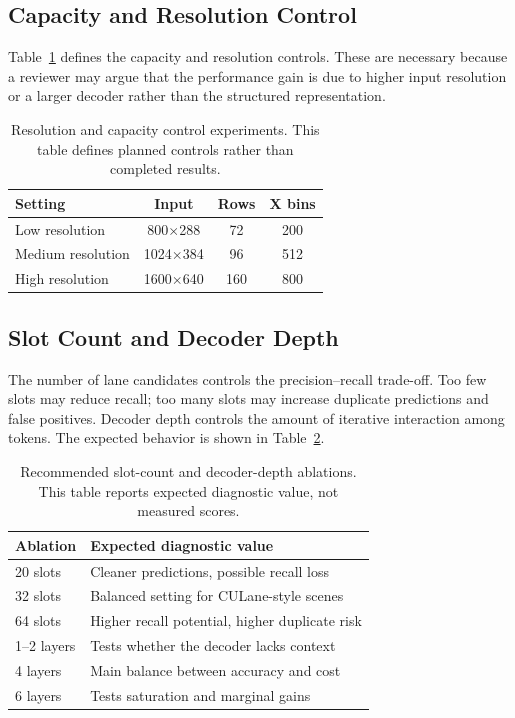 \documentclass[conference]{IEEEtran}
\begin{document}
\subsection{Capacity and Resolution Control}

Table~\ref{tab:capacity} defines the capacity and resolution controls. These are necessary because a reviewer may argue that the performance gain is due to higher input resolution or a larger decoder rather than the structured representation.

\begin{table}[t]
\centering
\caption{Resolution and capacity control experiments. This table defines planned controls rather than completed results.}
\label{tab:capacity}
\begin{tabular}{lccc}
\toprule
Setting & Input & Rows & X bins \\
\midrule
Low resolution & 800$\times$288 & 72 & 200 \\
Medium resolution & 1024$\times$384 & 96 & 512 \\
High resolution & 1600$\times$640 & 160 & 800 \\
\bottomrule
\end{tabular}
\end{table}

\subsection{Slot Count and Decoder Depth}

The number of lane candidates controls the precision--recall trade-off. Too few slots may reduce recall; too many slots may increase duplicate predictions and false positives. Decoder depth controls the amount of iterative interaction among tokens. The expected behavior is shown in Table~\ref{tab:slot-depth}.

\begin{table}[t]
\centering
\caption{Recommended slot-count and decoder-depth ablations. This table reports expected diagnostic value, not measured scores.}
\label{tab:slot-depth}
\begin{tabular}{l p{5.3cm}}
\toprule
Ablation & Expected diagnostic value \\
\midrule
20 slots & Cleaner predictions, possible recall loss \\
32 slots & Balanced setting for CULane-style scenes \\
64 slots & Higher recall potential, higher duplicate risk \\
1--2 layers & Tests whether the decoder lacks context \\
4 layers & Main balance between accuracy and cost \\
6 layers & Tests saturation and marginal gains \\
\bottomrule
\end{tabular}
\end{table}
\end{document}
